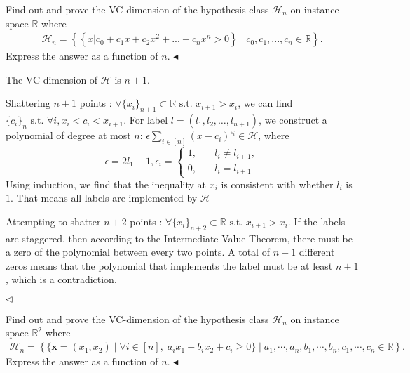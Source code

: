 \documentclass[11pt]{article}
\newenvironment{problem}[2][Problem]{\begin{trivlist}
\item[\hskip \labelsep {\bfseries #1}\hskip \labelsep {\bfseries #2.}]}{\hfill$\blacktriangleleft$\end{trivlist}}
\newenvironment{answer}[1][Answer]{\begin{trivlist}
\item[\hskip \labelsep {\bfseries #1.}\hskip \labelsep]}{\hfill$\lhd$\end{trivlist}}
\begin{document}
\begin{problem}{2 (10')} Find out and prove the VC-dimension of the hypothesis class $\mathcal{H}_n$ on instance space $\mathbb{R}$ where
    \begin{align*}
        \mathcal{H}_n=\left\{\left\{x|c_0+c_1x+c_2x^2+...+c_nx^n>0\right\}\mid c_0,c_1,...,c_n\in\mathbb{R}\right\}.
    \end{align*}
    Express the answer as a function of $n$.
\end{problem}
\begin{answer}
    The VC dimension of $\mathcal{H}$ is $n+1$.
    
    Shattering $n+1$ points : $\forall \{x_i\}_{n+1}\subset \mathbb R \text{ s.t. } x_{i+1}>x_i$, we can find $\{c_i\}_{n} \text{ s.t. } \forall i, x_i< c_i< x_{i+1}$. For label $l = (l_1,l_2,\dots,l_{n+1})$, we construct a polynomial of degree at most $n$: $\epsilon\sum_{i\in [n]} (x-c_i)^{\epsilon_i}\in \mathcal H$, where
    $$\epsilon = 2l_1-1, \epsilon_i =\begin{cases}1, \quad & l_{i}\neq l_{i+1},\\ 0, &l_i =l_{i+1} \end{cases}$$
    Using induction, we find that the inequality at $x_i$ is consistent with whether $l_i$ is $1$. That means all labels are implemented by $\mathcal H$

    Attempting to shatter $n+2$ points : $\forall \{x_i\}_{n+2}\subset \mathbb R\text{ s.t. } x_{i+1}>x_i$. If the labels are staggered, then according to the Intermediate Value Theorem, there must be a zero of the polynomial between every two points. A total of $n+1$ different zeros means that the polynomial that implements the label must be at least $n+1$, which is a contradiction.
    
\end{answer}

\begin{problem}{3 (16')} Find out and prove the VC-dimension of the hypothesis class $\mathcal{H}_n$ on instance space $\mathbb{R}^2$ where
\begin{align*}
    \mathcal{H}_n=\left\{\{\bm x = (x_1, x_2)\mid \forall i\in [n], \; a_ix_1 + b_ix_2 + c_i \geq 0\} \mid a_1, \cdots, a_n, b_1, \cdots, b_n, c_1, \cdots, c_n\in \mathbb{R}\right\}.
\end{align*}
Express the answer as a function of $n$.
\end{problem}
\end{document}

